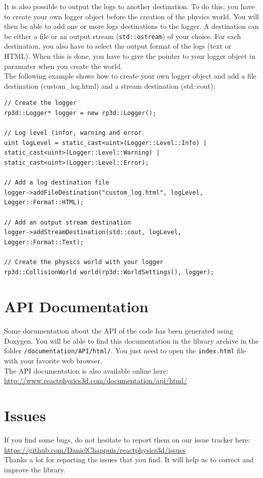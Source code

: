 \documentclass[a4paper,12pt]{article}
\begin{document}
    It is also possible to output the logs to another destination. To do this,
    you have to create your own logger object before the creation of the physics world. You will then be able to add one or more logs destinations
    to the logger. A destination can be either a file or an output stream (\texttt{std::ostream}) of your choice. For each destination, you also
    have to select the output format of the logs (text or HTML). When this is done, you have to give the pointer to your logger object in paramater
    when you create the world. \\

    The following example shows how to create your own logger object and add a file destination (custom\_log.html) and a stream destination (std::cout): \\

    \begin{lstlisting}
// Create the logger
rp3d::Logger* logger = new rp3d::Logger();

// Log level (infor, warning and error
uint logLevel = static_cast<uint>(Logger::Level::Info) | static_cast<uint>(Logger::Level::Warning) |
static_cast<uint>(Logger::Level::Error);

// Add a log destination file
logger->addFileDestination("custom_log.html", logLevel, Logger::Format::HTML);

// Add an output stream destination 
logger->addStreamDestination(std::cout, logLevel, Logger::Format::Text);

// Create the physics world with your logger
rp3d::CollisionWorld world(rp3d::WorldSettings(), logger);
    \end{lstlisting}


   \section{API Documentation}

   Some documentation about the API of the code has been generated
   using Doxygen. You will be able to find this documentation in the library archive in the folder \texttt{/documentation/API/html/}. You just
   need to open the \texttt{index.html} file with your favorite web browser. \\

   The API documentation is also available online here: \url{http://www.reactphysics3d.com/documentation/api/html/}


   \section{Issues}

   If you find some bugs, do not hesitate to report them on our issue tracker here: \\

   \url{https://github.com/DanielChappuis/reactphysics3d/issues} \\

   Thanks a lot for reporting the issues that you find. It will help us to correct and improve the library.
\end{document}
